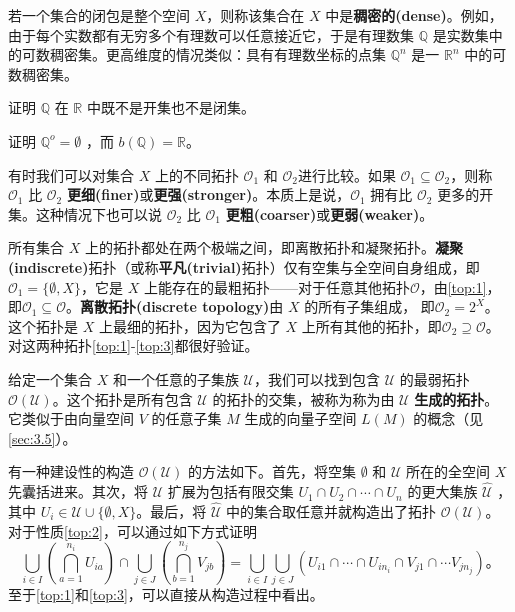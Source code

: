 \begin{theorem}
\begin{theorem}
\begin{eg}\label{eg:10.6}
	若一个集合的闭包是整个空间 $X$，则称该集合在 $X$ 中是\textbf{稠密的(dense)}。例如，由于每个实数都有无穷多个有理数可以任意接近它，于是有理数集 $\mathbb{Q}$ 是实数集中的可数稠密集。更高维度的情况类似：具有有理数坐标的点集 $\mathbb{Q}^{n}$ 是一 $\mathbb{R}^{n}$ 中的可数稠密集。
\end{eg}

\begin{exercise}
	证明 $\mathbb{Q}$ 在 $\mathbb{R}$ 中既不是开集也不是闭集。
\end{exercise}

\begin{exercise}
	证明 $\mathbb{Q}^{o} =\emptyset $ ，而 $b(\mathbb{Q}) =\mathbb{R}$。
\end{exercise}

	有时我们可以对集合 $X$ 上的不同拓扑 $\mathcal{O}_{1}$ 和 $\mathcal{O}_{2}$进行比较。如果 $\mathcal{O}_{1} \subseteq \mathcal{O}_{2}$，则称 $\mathcal{O}_{1}$ 比 $\mathcal{O}_{2}$ \textbf{更细(finer)}或\textbf{更强(stronger)}。本质上是说，$\mathcal{O}_{1}$ 拥有比 $\mathcal{O}_{2}$ 更多的开集。这种情况下也可以说 $\mathcal{O}_{2}$ 比 $\mathcal{O}_{1}$ \textbf{更粗(coarser)}或\textbf{更弱(weaker)}。

\begin{eg}\label{eg:10.7}
	所有集合 $X$ 上的拓扑都处在两个极端之间，即离散拓扑和凝聚拓扑。\textbf{凝聚(indiscrete)}拓扑（或称\textbf{平凡(trivial)}拓扑）仅有空集与全空间自身组成，即$\mathcal{O}_{1} =\{\emptyset ,X\}$，它是 $X$ 上能存在的最粗拓扑——对于任意其他拓扑$\mathcal{O}$，由\ref{top:1}，即$\mathcal{O}_{1} \subseteq \mathcal{O}$。\textbf{离散拓扑(discrete topology)}由 $X$ 的所有子集组成， 即$\mathcal{O}_{2} =2^{X}$。这个拓扑是 $X$ 上最细的拓扑，因为它包含了 $X$ 上所有其他的拓扑，即$\mathcal{O}_{2} \supseteq \mathcal{O}$。对这两种拓扑\ref{top:1}-\ref{top:3}都很好验证。
\end{eg}

	给定一个集合 $X$ 和一个任意的子集族 $\mathcal{U}$，我们可以找到包含 $\mathcal{U}$ 的最弱拓扑 $\mathcal{O} (\mathcal{U} )$。这个拓扑是所有包含 $\mathcal{U}$ 的拓扑的交集，被称为称为由 $\mathcal{U}$ \textbf{生成的拓扑}。它类似于由向量空间 $V$ 的任意子集 $M$ 生成的向量子空间 $L(M)$ 的概念（见\ref{sec:3.5}）。

	有一种建设性的构造 $\mathcal{O} (\mathcal{U} )$ 的方法如下。首先，将空集 $\emptyset $ 和 $\mathcal{U}$ 所在的全空间 $X$ 先囊括进来。其次，将 $\mathcal{U}$ 扩展为包括有限交集 $U_{1} \cap U_{2} \cap \cdots \cap U_{n}$ 的更大集族 $\hat{\mathcal{U}}$ ，其中 $U_{i} \in \mathcal{U} \cup \{\emptyset ,X\}$。最后，将 $\hat{\mathcal{U}}$ 中的集合取任意并就构造出了拓扑 $\mathcal{O} (\mathcal{U} )$。对于性质\ref{top:2}，可以通过如下方式证明
\begin{equation*}
    \bigcup _{i\in I}\left(\bigcap _{a=1}^{n_{i}} U_{ia}\right) \cap \bigcup _{j\in J}\left(\bigcap _{b=1}^{n_{j}} V_{jb}\right) =\bigcup _{i\in I}\bigcup _{j\in J}( U_{i1} \cap \cdots \cap U_{in_{i}} \cap V_{j1} \cap \cdots V_{jn_{j}}) 。
\end{equation*}
至于\ref{top:1}和\ref{top:3}，可以直接从构造过程中看出。


\end{theorem}
\end{theorem}
